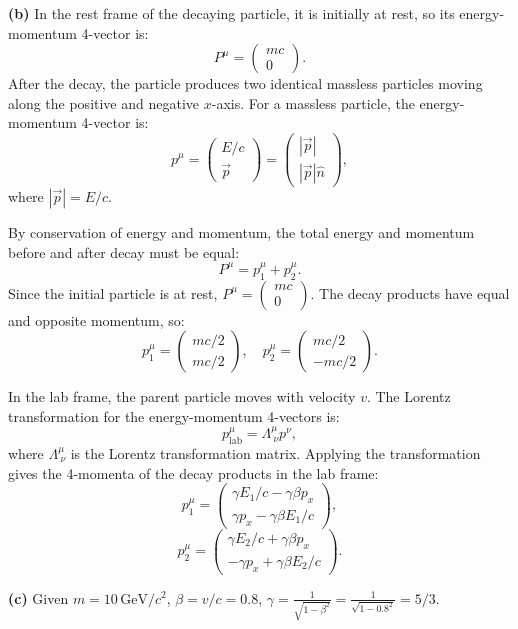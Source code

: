 \textbf{(b)} In the rest frame of the decaying particle, it is initially at rest, so its energy-momentum 4-vector is:
\[
P^\mu = \begin{pmatrix} mc \\ 0 \end{pmatrix}.
\]
After the decay, the particle produces two identical massless particles moving along the positive and negative \(x\)-axis. For a massless particle, the energy-momentum 4-vector is:
\[
p^\mu = \begin{pmatrix} E/c \\ \vec{p} \end{pmatrix} = \begin{pmatrix} |\vec{p}| \\ |\vec{p}| \hat{n} \end{pmatrix},
\]
where \(|\vec{p}| = E/c\).

By conservation of energy and momentum, the total energy and momentum before and after decay must be equal:
\[
P^\mu = p_1^\mu + p_2^\mu.
\]
Since the initial particle is at rest, \(P^\mu = \begin{pmatrix} mc \\ 0 \end{pmatrix}\). The decay products have equal and opposite momentum, so:
\[
p_1^\mu = \begin{pmatrix} mc/2 \\ mc/2 \end{pmatrix}, \quad p_2^\mu = \begin{pmatrix} mc/2 \\ -mc/2 \end{pmatrix}.
\]

In the lab frame, the parent particle moves with velocity \(v\). The Lorentz transformation for the energy-momentum 4-vectors is:
\[
p^\mu_{\text{lab}} = \Lambda^\mu_{\ \nu} p^\nu,
\]
where \(\Lambda^\mu_{\ \nu}\) is the Lorentz transformation matrix. Applying the transformation gives the 4-momenta of the decay products in the lab frame:
\[
p_1^\mu = \begin{pmatrix} \gamma E_1/c - \gamma \beta p_x \\ \gamma p_x - \gamma \beta E_1/c \end{pmatrix},
\]
\[
p_2^\mu = \begin{pmatrix} \gamma E_2/c + \gamma \beta p_x \\ -\gamma p_x + \gamma \beta E_2/c \end{pmatrix}.
\]

\textbf{(c)} Given \(m = 10 \, \text{GeV}/c^2\), \(\beta = v/c = 0.8\), \(\gamma = \frac{1}{\sqrt{1-\beta^2}} = \frac{1}{\sqrt{1-0.8^2}} = 5/3\).

